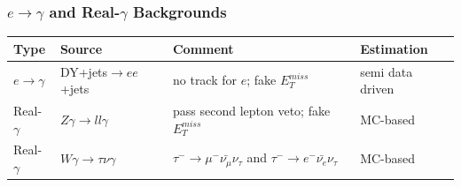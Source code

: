 \begin{frame}\frametitle {$e\rightarrow\gamma$ and Real-$\gamma$ Backgrounds}

  \begin{table}[h]
     \tiny
     \begin{center}
     \begin{tabular}{|l|l|l|l|}
     \hline
     Type & Source & Comment & Estimation \\ \hline
     $e\rightarrow\gamma$ & DY+jets$\rightarrow ee$+jets & no track for $e$; fake $E_T^{miss}$ & semi data driven\\\hline
     Real-$\gamma$ & $Z\gamma \rightarrow ll\gamma$ & pass second lepton veto; fake $E_T^{miss}$ & MC-based\\\hline
     Real-$\gamma$ & $W\gamma \rightarrow \tau\nu\gamma$ & $\tau^- \rightarrow \mu^- \bar{\nu_{\mu}} \nu_{\tau}$ and $\tau^- \rightarrow e^- \bar{\nu_{e}} \nu_{\tau}$ & MC-based\\
     \hline
      \end{tabular}
      \end{center}
  \end{table}


\end{frame}
